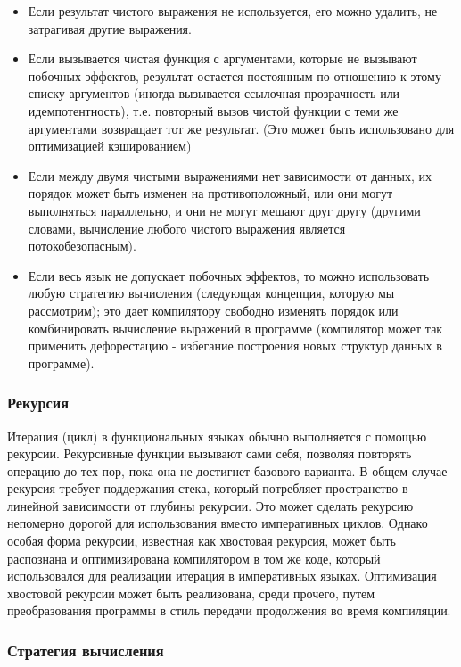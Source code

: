 \begin{itemize}
	\item Если результат чистого выражения не используется, его можно удалить, не затрагивая другие выражения.
	\item Если вызывается чистая функция с аргументами, которые не вызывают побочных эффектов, результат остается постоянным по отношению к этому списку аргументов (иногда вызывается ссылочная прозрачность или идемпотентность), т.е. повторный вызов чистой функции с теми же аргументами возвращает тот же результат. (Это может быть использовано для оптимизацией кэшированием)
	\item Если между двумя чистыми выражениями нет зависимости от данных, их порядок может быть изменен на противоположный, или они могут выполняться параллельно, и они не могут мешают друг другу (другими словами, вычисление любого чистого выражения является потокобезопасным).
	\item Если весь язык не допускает побочных эффектов, то можно использовать любую стратегию вычисления (следующая концепция, которую мы рассмотрим); это дает компилятору свободно изменять порядок или комбинировать вычисление выражений в программе (компилятор может так применить дефорестацию - избегание построения новых структур данных в программе).
\end{itemize}

\subsubsection{Рекурсия}

Итерация (цикл) в функциональных языках обычно выполняется с помощью рекурсии. Рекурсивные функции вызывают сами себя, позволяя повторять операцию до тех пор, пока она не достигнет базового варианта. В общем случае рекурсия требует поддержания стека, который потребляет пространство в линейной зависимости от глубины рекурсии. Это может сделать рекурсию непомерно дорогой для использования вместо императивных циклов. Однако особая форма рекурсии, известная как хвостовая рекурсия, может быть распознана и оптимизирована компилятором в том же коде, который использовался для реализации итерация в императивных языках. Оптимизация хвостовой рекурсии может быть реализована, среди прочего, путем преобразования программы в стиль передачи продолжения во время компиляции.

\subsubsection{Стратегия вычисления}

